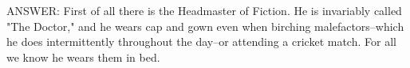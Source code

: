 
    ANSWER:
    First of all there is the Headmaster of Fiction. He is invariably called
"The Doctor," and he wears cap and gown even when birching
malefactors--which he does intermittently throughout the day--or
attending a cricket match. For all we know he wears them in bed.
